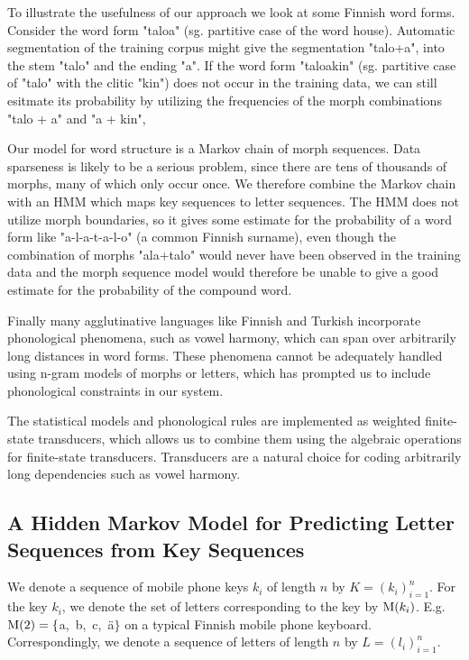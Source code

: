 \documentclass{llncs}
\begin{document}
To illustrate the usefulness of our approach we look at some Finnish
word forms. Consider the word form "taloa" (sg. partitive case of
the word house). Automatic segmentation of the training corpus might
give the segmentation "talo+a", into the stem "talo" and the ending
"a". If the word form "taloakin" (sg. partitive case of "talo" with
the clitic "kin") does not occur in the training data, we can still
esitmate its probability by utilizing the frequencies of the morph
combinations "talo + a" and "a + kin",

Our model for word structure is a Markov chain of morph
sequences. Data sparseness is likely to be a serious problem, since
there are tens of thousands of morphs, many of which only occur
once. We therefore combine the Markov chain with an
HMM which maps key sequences to letter sequences. The HMM does not
utilize morph boundaries, so it gives some estimate for the
probability of a word form like "a-l-a-t-a-l-o" (a common Finnish
surname), even though the combination of morphs "ala+talo" would never
have been observed in the training data and the morph sequence model
would therefore be unable to give a good estimate for the probability
of the compound word.

Finally many agglutinative languages like Finnish and Turkish
incorporate phonological phenomena, such as vowel harmony, which can
span over arbitrarily long distances in word forms. These phenomena
cannot be adequately handled using n-gram models of morphs or letters,
which has prompted us to include phonological constraints in our
system.

The statistical models and phonological rules are implemented as
weighted finite-state transducers, which allows us to combine them using
the algebraic operations for finite-state transducers. Transducers are
a natural choice for coding arbitrarily long dependencies such as
vowel harmony.

\subsection{A Hidden Markov Model for Predicting Letter Sequences from Key Sequences}

We denote a sequence of mobile phone keys $k_i$ of length $n$ by $K =
(k_i)_{i=1}^{n}$. For the key $k_i$, we denote the set of letters
corresponding to the key by ${\rm M}(k_i)$. E.g. ${\rm M}(2) =
\{$a,~b,~c,~\"{a}$\}$ on a typical Finnish mobile phone
keyboard. Correspondingly, we denote a sequence of letters of length
$n$ by $L = (l_i)_{i=1}^{n}$.
\end{document}
